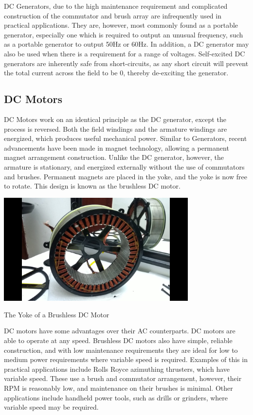 \documentclass[11pt,a4paper]{article}
\begin{document}
DC Generators, due to the high maintenance requirement and complicated construction of the commutator and brush array are infrequently used in practical applications. They are, however, most commonly found as a portable generator, especially one which is required to output an unusual frequency, such as a portable generator to output 50Hz or 60Hz. In addition, a DC generator may also be used when there is a requirement for a range of voltages. Self-excited DC generators are inherently safe from short-circuits, as any short circuit will prevent the total current across the field to be 0, thereby de-exciting the generator.
\subsection{DC Motors}
DC Motors work on an identical principle as the DC generator, except the process is reversed. Both the field windings and the armature windings are energized, which produces useful mechanical power. Similar to Generators, recent advancements have been made in magnet technology, allowing a permanent magnet arrangement construction. Unlike the DC generator, however, the armature is stationary, and energized externally without the use of commutators and brushes. Permanent magnets are placed in the yoke, and the yoke is now free to rotate. This design is known as the brushless DC motor.

\begin{center}
\includegraphics[width=10cm]{bldc.jpg}\par
The Yoke of a Brushless DC Motor
\end{center}

DC motors have some advantages over their AC counterparts. DC motors are able to operate at any speed. Brushless DC motors also have simple, reliable construction, and with low maintenance requirements they are ideal for low to medium power requirements where variable speed is required. Examples of this in practical applications include Rolls Royce azimuthing thrusters, which have variable speed. These use a brush and commutator arrangement, however, their RPM is reasonably low, and maintenance on their brushes is minimal. Other applications include handheld power tools, such as drills or grinders, where variable speed may be required.
\end{document}
